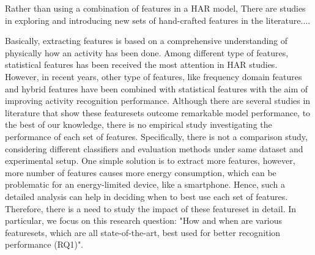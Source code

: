 \documentclass[journal,article,submit,moreauthors,pdftex]{Definitions/mdpi}
\begin{document}
Rather than using a combination of features in a HAR model, There are studies in exploring and introducing new sets of hand-crafted features in the literature....






Basically, extracting features is based on a comprehensive understanding of physically how an activity has been done. Among different type of features, statistical features has been received the most attention in HAR studies. However, in recent years, other type of features, like frequency domain features and hybrid features have been combined with statistical features with the aim of improving activity recognition performance\cite{wang2019survey, morris2014recofit}. Although there are several studies in literature that show these featuresets outcome remarkable model performance, to the best of our knowledge, there is no empirical study investigating the performance of each set of features. Specifically, there is not a comparison study, considering different classifiers and evaluation methods under same dataset and experimental setup. One simple solution is to extract more features, however, more number of features causes more energy consumption, which can be problematic for an energy-limited device, like a smartphone\cite{Nourani_CoMoRea2019}. Hence, such a detailed analysis can help in deciding when to best use each set of features. Therefore, there is a need to study the impact of these featureset in detail. In particular, we focus on this research question: "How and when are various featuresets, which are all state-of-the-art, best used for better recognition performance (RQ1)".
\end{document}
